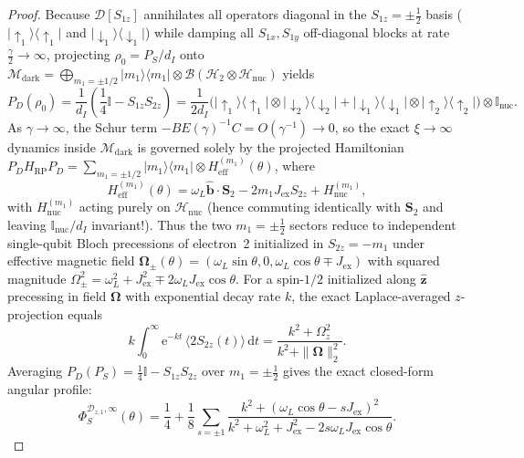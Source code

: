 \documentclass[onecolumn,10pt,notitlepage,amsmath,amssymb,floatfix]{revtex4-2}
\theoremstyle{plain}
\theoremstyle{definition}
\newcommand{\dd}{\mathrm{d}}
\newcommand{\ee}{\mathrm{e}}
\newcommand{\PS}{P_S}
\newcommand{\HRP}{H_{\mathrm{RP}}}
\begin{document}
\begin{proof}
Because $\mathcal{D}[S_{1z}]$ annihilates all operators diagonal in the $S_{1z} = \pm\frac{1}{2}$ basis ($|{\uparrow_1}\rangle\langle{\uparrow_1}|$ and $|{\downarrow_1}\rangle\langle{\downarrow_1}|$) while damping all $S_{1x}, S_{1y}$ off-diagonal blocks at rate $\frac{\gamma}{2} \to \infty$, projecting $\rho_0 = \PS/d_I$ onto $\mathcal{M}_{\mathrm{dark}} = \bigoplus_{m_1=\pm 1/2} |m_1\rangle\langle m_1| \otimes \mathcal{B}(\mathcal{H}_2 \otimes \mathcal{H}_{\mathrm{nuc}})$ yields
\[
P_D(\rho_0) = \frac{1}{d_I}\left(\frac{1}{4}\mathbb{I} - S_{1z}S_{2z}\right)
= \frac{1}{2d_I}\Big(|{\uparrow_1}\rangle\langle{\uparrow_1}| \otimes |{\downarrow_2}\rangle\langle{\downarrow_2}| + |{\downarrow_1}\rangle\langle{\downarrow_1}| \otimes |{\uparrow_2}\rangle\langle{\uparrow_2}|\Big) \otimes \mathbb{I}_{\mathrm{nuc}}.
\]
As $\gamma \to \infty$, the Schur term $-B E(\gamma)^{-1} C = O(\gamma^{-1}) \to 0$, so the exact $\xi\to\infty$ dynamics inside $\mathcal{M}_{\mathrm{dark}}$ is governed solely by the projected Hamiltonian $P_D \HRP P_D = \sum_{m_1=\pm 1/2} |m_1\rangle\langle m_1| \otimes H_{\mathrm{eff}}^{(m_1)}(\theta)$, where
\[
H_{\mathrm{eff}}^{(m_1)}(\theta) = \omega_L \hat{\mathbf{b}}\cdot\mathbf{S}_2 - 2 m_1 J_{\mathrm{ex}} S_{2z} + H_{\mathrm{nuc}}^{(m_1)},
\]
with $H_{\mathrm{nuc}}^{(m_1)}$ acting purely on $\mathcal{H}_{\mathrm{nuc}}$ (hence commuting identically with $\mathbf{S}_2$ and leaving $\mathbb{I}_{\mathrm{nuc}}/d_I$ invariant!). Thus the two $m_1 = \pm\frac{1}{2}$ sectors reduce to independent single-qubit Bloch precessions of electron~2 initialized in $S_{2z} = -m_1$ under effective magnetic field $\boldsymbol{\Omega}_\pm(\theta) = (\omega_L\sin\theta, 0, \omega_L\cos\theta \mp J_{\mathrm{ex}})$ with squared magnitude $\Omega_\pm^2 = \omega_L^2 + J_{\mathrm{ex}}^2 \mp 2\omega_L J_{\mathrm{ex}}\cos\theta$. For a spin-$1/2$ initialized along $\hat{\mathbf{z}}$ precessing in field $\boldsymbol{\Omega}$ with exponential decay rate $k$, the exact Laplace-averaged $z$-projection equals
\[
k\int_0^\infty \ee^{-kt}\,\langle 2 S_{2z}(t)\rangle\,\dd t
= \frac{k^2 + \Omega_z^2}{k^2 + \|\boldsymbol{\Omega}\|_2^2}.
\]
Averaging $P_D(\PS) = \frac{1}{4}\mathbb{I} - S_{1z}S_{2z}$ over $m_1 = \pm\frac{1}{2}$ gives the exact closed-form angular profile:
\begin{equation}
\label{eq:S3_z1_theta}
\Phi_S^{\mathcal{D}_{z,1},\infty}(\theta)
= \frac{1}{4} + \frac{1}{8}\sum_{s=\pm 1} \frac{k^2 + (\omega_L\cos\theta - s J_{\mathrm{ex}})^2}{k^2 + \omega_L^2 + J_{\mathrm{ex}}^2 - 2 s \omega_L J_{\mathrm{ex}}\cos\theta}.

\end{equation}
\end{proof}
\end{document}
